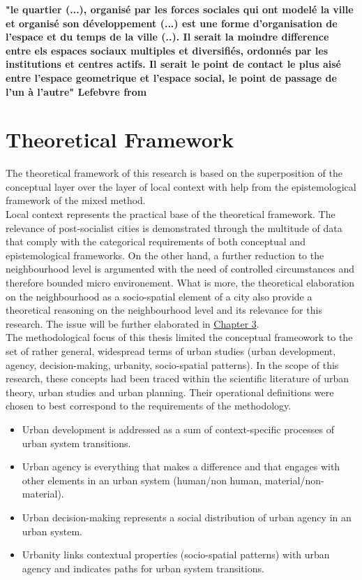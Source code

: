 \documentclass[11pt]{report}
\begin{document}
\textbf{"le quartier (...), organisé par les forces sociales qui ont modelé la ville et organisé son développement (...) est une forme d'organisation de l'espace et du temps de la ville (..). Il serait la moindre difference entre els espaces sociaux multiples et diversifiés, ordonnés par les institutions et centres actifs. Il serait le point de contact le plus aisé entre l'espace geometrique et l'espace social, le point de passage de l'un à l'autre" Lefebvre from \href{Merlin}{\citealt{Merlin et Cloay 2009}}}

\section{Theoretical Framework}

The theoretical framework of this research is based on the superposition of the conceptual layer over the layer of local context with help from the epistemological framework of the mixed method.
\\

Local context represents the practical base of the theoretical framework.
The relevance of post-socialist cities is demonstrated through the multitude of data that comply with the categorical requirements of both conceptual and epistemological frameworks.
On the other hand, a further reduction to the neighbourhood level is argumented with the need of controlled circumstances and therefore bounded micro environement. What is more, the theoretical elaboration on the neighbourhood as a socio-spatial element of a city also provide a theoretical reasoning on the neighbourhood level and its relevance for this research. The issue will be further elaborated in \href{Chapter 3}{Chapter 3}.
\\

The methodological focus of this thesis limited the conceptual frameowork to the set of rather general, widespread terms of urban studies (urban development, agency, decision-making, urbanity, socio-spatial patterns).
In the scope of this research, these concepts had been traced within the scientific literature of urban theory, urban studies and urban planning. Their operational definitions were chosen to best correspond to the requirements of the methodology.

\begin{itemize}
\item Urban development is addressed as a sum of context-specific processes of urban system transitions.
\item Urban agency is everything that makes a difference and that engages with other elements in an urban system (human/non human, material/non-material).
\item Urban decision-making represents a social distribution of urban agency in an urban system.
\item Urbanity links contextual properties (socio-spatial patterns) with urban agency and indicates paths for urban system transitions.
\end{itemize}
\end{document}
